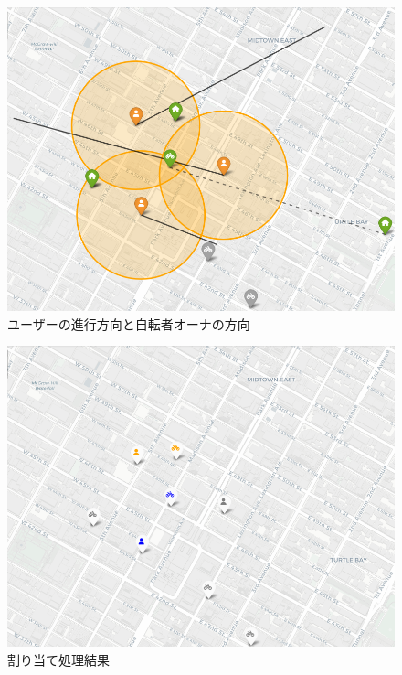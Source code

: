           \begin{figure}[htbp]
            \centering
            \includegraphics[scale=0.35]
            {figures/simulation3.png}
            \caption{ユーザーの進行方向と自転者オーナの方向}
            \label{fig:ユーザーの進行方向と自転者オーナの方向}
          \end{figure}

          \begin{figure}[htbp]
            \centering
            \includegraphics[scale=0.35]
            {figures/simulation4.png}
            \caption{割り当て処理結果}
            \label{fig:割り当て処理結果}
          \end{figure}

